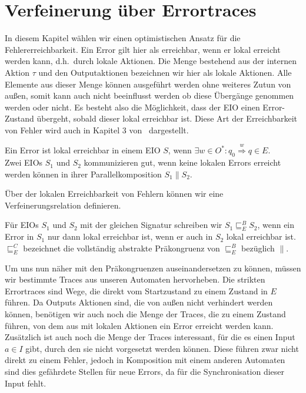 \chapter{Verfeinerung über Errortraces}

In diesem Kapitel wählen wir einen optimistischen Ansatz für die
Fehlererreichbarkeit. Ein Error gilt hier als erreichbar, wenn er lokal
erreicht werden kann, d.h.\ durch lokale Aktionen. Die Menge bestehend aus der
internen Aktion $\tau$ und den Outputaktionen bezeichnen wir hier als lokale
Aktionen. Alle Elemente aus dieser Menge können ausgeführt werden ohne
weiteres Zutun von außen, somit kann auch nicht beeinflusst werden ob diese
Übergänge genommen werden oder nicht. Es besteht also die Möglichkeit, dass
der EIO einen Error-Zustand übergeht, sobald dieser lokal erreichbar ist. Diese
Art der Erreichbarkeit von Fehler wird auch in Kapitel 3 von~\cite{Vogler2014EIO}
dargestellt.

\begin{Def}
  Ein Error ist lokal erreichbar in einem EIO $S$, wenn $\exists w\in O^*: q_0
  \overset{w}{\Rightarrow} q\in E$.\\
  Zwei EIOs $S_1$ und $S_2$ kommunizieren gut, wenn keine lokalen Errors erreicht
  werden können in ihrer Parallelkomposition $S_1\| S_2$.
\end{Def}

Über der lokalen Erreichbarkeit von Fehlern können wir eine
Verfeinerungsrelation definieren.

\begin{Def}
  Für EIOs $S_1$ und $S_2$ mit der gleichen Signatur schreiben wir $S_1\sqsubseteq
  _E^ B S_2$, wenn ein Error in $S_1$ nur dann lokal erreichbar ist, wenn er
  auch in $S_2$ lokal erreichbar ist.\\
  $\sqsubseteq _E^C$ bezeichnet die vollständig abstrakte Präkongruenz von
  $\sqsubseteq _E^B$ bezüglich $\|$.
\end{Def}

Um uns nun näher mit den Präkongruenzen auseinandersetzen zu können, müssen wir bestimmte Traces
aus unseren Automaten hervorheben. Die strikten Errortraces sind Wege, die
direkt vom Startzustand zu einem Zustand in $E$ führen. Da Outputs Aktionen
sind, die von außen nicht verhindert werden können, benötigen wir auch noch die
Menge der Traces, die zu einem Zustand führen, von dem aus mit lokalen Aktionen
ein Error erreicht werden kann. Zusätzlich ist auch noch die Menge der Traces
interessant, für die es einen Input $a\in I$ gibt, durch den sie nicht
vorgesetzt werden können. Diese führen zwar nicht
direkt zu einem Fehler, jedoch in Komposition mit einem anderen Automaten sind
dies gefährdete Stellen für neue Errors, da für die Synchronisation dieser Input
fehlt.

